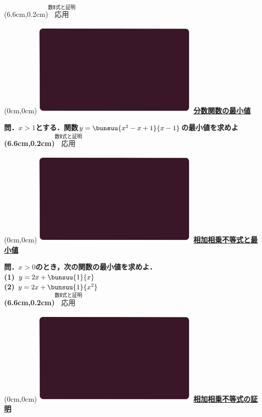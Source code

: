 \documentclass[10pt,
fleqn,
dvipdfmx,
uplatex
]{jsarticle}
\begin{document}
\at(6.6cm,0.2cm){\small\color{bradorange}$\overset{\text{数Ⅱ式と証明}}{\text{応用}}$}


\newpage



\at(0cm,0cm){\includegraphics[width=8cm,bb=0 0 1920 1080]{./youtube/thumbnails/templates/smart_background/数II式と証明.jpeg}}
{\color{orange}\bf\boldmath\huge\underline{分数関数の最小値}}\vspace{0.3zw}

\huge 
\bf\boldmath 問．$x>1$とする．関数$y=\bunsuu{{x^2-x+1}}{{x-1}}$の最小値を求めよ
\at(6.6cm,0.2cm){\small\color{bradorange}$\overset{\text{数Ⅱ式と証明}}{\text{応用}}$}


\newpage



\at(0cm,0cm){\includegraphics[width=8cm,bb=0 0 1920 1080]{./youtube/thumbnails/templates/smart_background/数II式と証明.jpeg}}
{\color{orange}\bf\boldmath\LARGE\underline{相加相乗不等式と最小値}}\vspace{0.3zw}

\LARGE 
\bf\boldmath 問．$x>0$のとき，次の関数の最小値を求めよ．\\
(1)  $y=2x+\bunsuu{1}{x}$\\
(2)  $y=2x+\bunsuu{1}{{}x^2}$\\

\at(6.6cm,0.2cm){\small\color{bradorange}$\overset{\text{数Ⅱ式と証明}}{\text{応用}}$}


\newpage



\at(0cm,0cm){\includegraphics[width=8cm,bb=0 0 1920 1080]{./youtube/thumbnails/templates/smart_background/数II式と証明.jpeg}}
{\color{orange}\bf\boldmath\LARGE\underline{相加相乗不等式の証明}}\vspace{0.3zw}
\end{document}
